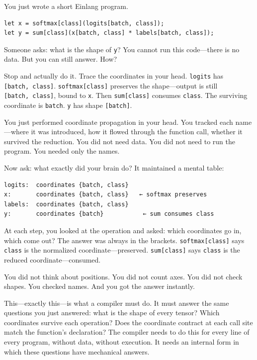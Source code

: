 \documentclass[11pt,titlepage]{article}
\begin{document}
\vspace{2em}

You just wrote a short Einlang program.

\begin{verbatim}
let x = softmax[class](logits[batch, class]);
let y = sum[class](x[batch, class] * labels[batch, class]);
\end{verbatim}

Someone asks: what is the shape of \texttt{y}? You cannot run this
code---there is no data. But you can still answer. How?

Stop and actually do it. Trace the coordinates in your head.
\texttt{logits} has \texttt{{[}batch,\ class{]}}.
\texttt{softmax{[}class{]}} preserves the shape---output is still
\texttt{{[}batch,\ class{]}}, bound to \texttt{x}. Then
\texttt{sum{[}class{]}} consumes \texttt{class}. The surviving
coordinate is \texttt{batch}. \texttt{y} has shape \texttt{{[}batch{]}}.

You just performed coordinate propagation in your head. You tracked each
name---where it was introduced, how it flowed through the function call,
whether it survived the reduction. You did not need data. You did not
need to run the program. You needed only the names.

Now ask: what exactly did your brain do? It maintained a mental table:

\begin{verbatim}
logits:  coordinates {batch, class}
x:       coordinates {batch, class}   ← softmax preserves
labels:  coordinates {batch, class}
y:       coordinates {batch}           ← sum consumes class
\end{verbatim}

At each step, you looked at the operation and asked: which coordinates
go in, which come out? The answer was always in the brackets.
\texttt{softmax{[}class{]}} says \texttt{class} is the normalized
coordinate---preserved. \texttt{sum{[}class{]}} says \texttt{class} is
the reduced coordinate---consumed.

You did not think about positions. You did not count axes. You did not
check shapes. You checked names. And you got the answer instantly.

This---exactly this---is what a compiler must do. It must answer the
same questions you just answered: what is the shape of every tensor?
Which coordinates survive each operation? Does the coordinate contract
at each call site match the function's declaration? The compiler needs
to do this for every line of every program, without data, without
execution. It needs an internal form in which these questions have
mechanical answers.
\end{document}

